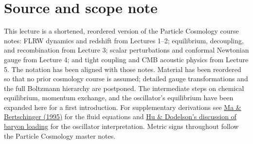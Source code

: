\documentclass[12pt]{article}
\begin{document}
\section*{Source and scope note}
This lecture is a shortened, reordered version of the Particle Cosmology course notes:
FLRW dynamics and redshift from Lectures 1--2; equilibrium, decoupling, and recombination
from Lecture 3; scalar perturbations and conformal Newtonian gauge from Lecture 4; and
tight coupling and CMB acoustic physics from Lecture 5. The notation has been aligned
with those notes. Material has been reordered so that no prior cosmology course is
assumed; detailed gauge transformations and the full Boltzmann hierarchy are postponed.
The intermediate steps on chemical equilibrium, momentum exchange, and the
oscillator's equilibrium have been expanded here for a first introduction.
For supplementary derivations see
\href{https://arxiv.org/abs/astro-ph/9506072}{Ma \& Bertschinger (1995)} for the
fluid equations and
\href{https://background.uchicago.edu/~whu/araa/node10.html}{Hu \& Dodelson's
discussion of baryon loading} for the oscillator interpretation. Metric signs
throughout follow the Particle Cosmology master notes.
\end{document}
